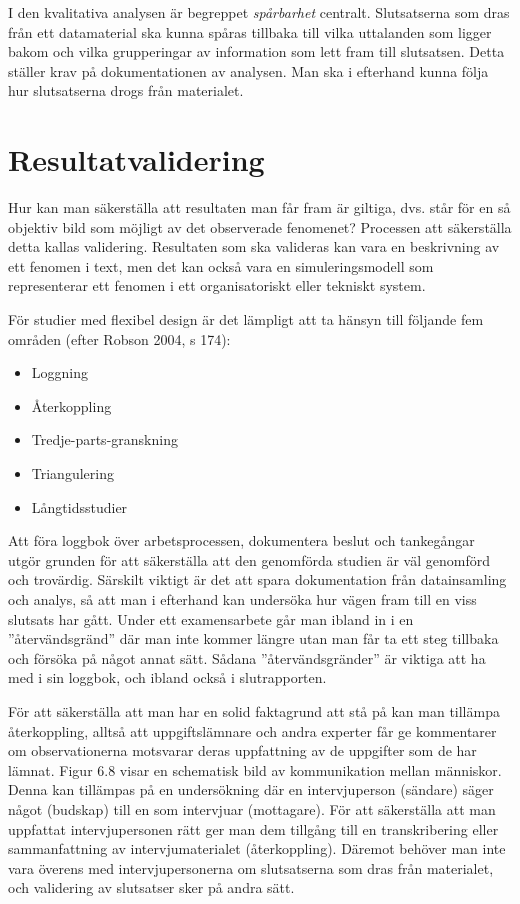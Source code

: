 I den kvalitativa analysen är begreppet \emph{spårbarhet} centralt.
Slutsatserna som dras från ett datamaterial ska kunna spåras tillbaka
till vilka uttalanden som ligger bakom och vilka grupperingar av
information som lett fram till slutsatsen. Detta ställer krav på
dokumentationen av analysen. Man ska i efterhand kunna följa hur
slutsatserna drogs från materialet.

\section{Resultatvalidering}\label{resultatvalidering}

Hur kan man säkerställa att resultaten man får fram är giltiga, dvs.
står för en så objektiv bild som möjligt av det observerade fenomenet?
Processen att säkerställa detta kallas validering. Resultaten som ska
valideras kan vara en beskrivning av ett fenomen i text, men det kan
också vara en simuleringsmodell som representerar ett fenomen i ett
organisatoriskt eller tekniskt system.

För studier med flexibel design är det lämpligt att ta hänsyn till
följande fem områden (efter Robson 2004, s 174):

\begin{itemize}
\item
  Loggning
\item
  Återkoppling
\item
  Tredje-parts-granskning
\item
  Triangulering
\item
  Långtidsstudier
\end{itemize}

Att föra loggbok över arbetsprocessen, dokumentera beslut och
tankegångar utgör grunden för att säkerställa att den genomförda studien
är väl genomförd och trovärdig. Särskilt viktigt är det att spara
dokumentation från datainsamling och analys, så att man i efterhand kan
undersöka hur vägen fram till en viss slutsats har gått. Under ett
examensarbete går man ibland in i en ''återvändsgränd'' där man inte
kommer längre utan man får ta ett steg tillbaka och försöka på något
annat sätt. Sådana ''återvändsgränder'' är viktiga att ha med i sin
loggbok, och ibland också i slutrapporten.

För att säkerställa att man har en solid faktagrund att stå på kan man
tillämpa återkoppling, alltså att uppgiftslämnare och andra experter får
ge kommentarer om observationerna motsvarar deras uppfattning av de
uppgifter som de har lämnat. Figur 6.8 visar en schematisk bild av
kommunikation mellan människor. Denna kan tillämpas på en undersökning
där en intervjuperson (sändare) säger något (budskap) till en som
intervjuar (mottagare). För att säkerställa att man uppfattat
intervjupersonen rätt ger man dem tillgång till en transkribering eller
sammanfattning av intervjumaterialet (återkoppling). Däremot behöver man
inte vara överens med intervjupersonerna om slutsatserna som dras från
materialet, och validering av slutsatser sker på andra sätt.

